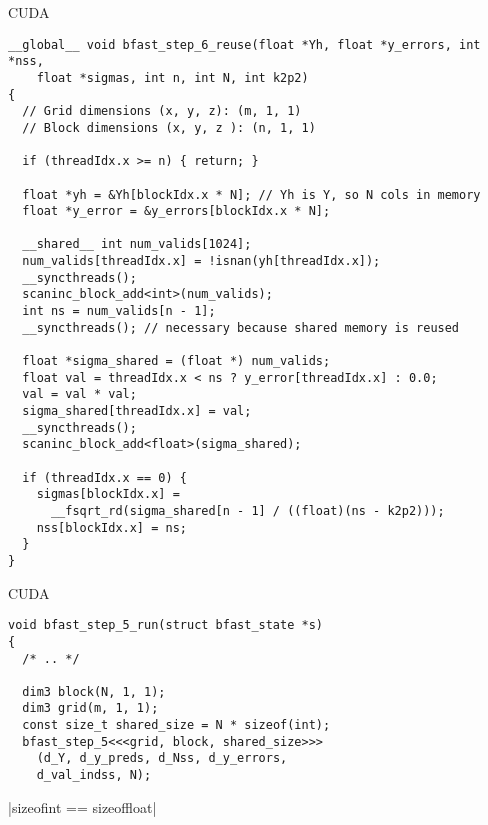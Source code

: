 \begin{frame}[fragile]{CUDA}

\begin{verbatim}
__global__ void bfast_step_6_reuse(float *Yh, float *y_errors, int *nss,
    float *sigmas, int n, int N, int k2p2)
{
  // Grid dimensions (x, y, z): (m, 1, 1)
  // Block dimensions (x, y, z ): (n, 1, 1)

  if (threadIdx.x >= n) { return; }

  float *yh = &Yh[blockIdx.x * N]; // Yh is Y, so N cols in memory
  float *y_error = &y_errors[blockIdx.x * N];

  __shared__ int num_valids[1024];
  num_valids[threadIdx.x] = !isnan(yh[threadIdx.x]);
  __syncthreads();
  scaninc_block_add<int>(num_valids);
  int ns = num_valids[n - 1];
  __syncthreads(); // necessary because shared memory is reused

  float *sigma_shared = (float *) num_valids;
  float val = threadIdx.x < ns ? y_error[threadIdx.x] : 0.0;
  val = val * val;
  sigma_shared[threadIdx.x] = val;
  __syncthreads();
  scaninc_block_add<float>(sigma_shared);

  if (threadIdx.x == 0) {
    sigmas[blockIdx.x] =
      __fsqrt_rd(sigma_shared[n - 1] / ((float)(ns - k2p2)));
    nss[blockIdx.x] = ns;
  }
}
\end{verbatim}

\end{frame}



\begin{frame}[fragile]{CUDA}

\begin{verbatim}
void bfast_step_5_run(struct bfast_state *s)
{
  /* .. */

  dim3 block(N, 1, 1);
  dim3 grid(m, 1, 1);
  const size_t shared_size = N * sizeof(int);
  bfast_step_5<<<grid, block, shared_size>>>
    (d_Y, d_y_preds, d_Nss, d_y_errors,
    d_val_indss, N);
\end{verbatim}

\pause

|sizeof{int} == sizeof{float}|


\end{frame}


